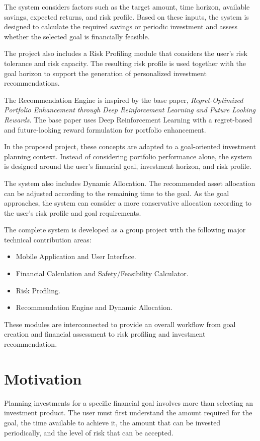 The system considers factors such as the target amount, time horizon, available savings, expected returns, and risk profile. Based on these inputs, the system is designed to calculate the required savings or periodic investment and assess whether the selected goal is financially feasible.

The project also includes a Risk Profiling module that considers the user's risk tolerance and risk capacity. The resulting risk profile is used together with the goal horizon to support the generation of personalized investment recommendations.

The Recommendation Engine is inspired by the base paper, \emph{Regret-Optimized Portfolio Enhancement through Deep Reinforcement Learning and Future Looking Rewards}. The base paper uses Deep Reinforcement Learning with a regret-based and future-looking reward formulation for portfolio enhancement.

In the proposed project, these concepts are adapted to a goal-oriented investment planning context. Instead of considering portfolio performance alone, the system is designed around the user's financial goal, investment horizon, and risk profile.

The system also includes Dynamic Allocation. The recommended asset allocation can be adjusted according to the remaining time to the goal. As the goal approaches, the system can consider a more conservative allocation according to the user's risk profile and goal requirements.

The complete system is developed as a group project with the following major technical contribution areas:
\begin{itemize}
	\item Mobile Application and User Interface.
	\item Financial Calculation and Safety/Feasibility Calculator.
	\item Risk Profiling.
	\item Recommendation Engine and Dynamic Allocation.
\end{itemize}
These modules are interconnected to provide an overall workflow from goal creation and financial assessment to risk profiling and investment recommendation.

\section{Motivation}
Planning investments for a specific financial goal involves more than selecting an investment product. The user must first understand the amount required for the goal, the time available to achieve it, the amount that can be invested periodically, and the level of risk that can be accepted.

